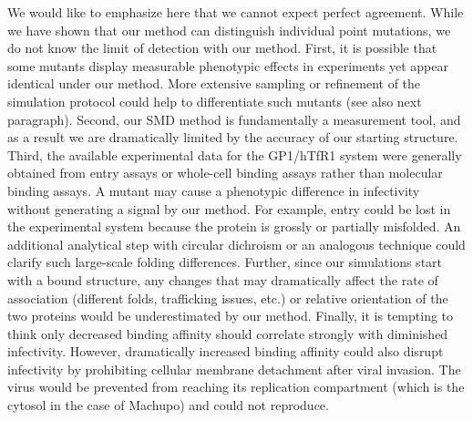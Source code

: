 \documentclass[12pt]{article}
\begin{document}

We would like to emphasize here that we cannot expect perfect agreement. While we have shown that our method can distinguish individual point mutations, we do not know the limit of detection with our method. First, it is possible that some mutants display measurable phenotypic effects in experiments yet appear identical under our method. More extensive sampling or refinement of the simulation protocol could help to differentiate such mutants (see also next paragraph). Second, our SMD method is fundamentally a measurement tool, and as a result we are dramatically limited by the accuracy of our starting structure. Third, the available experimental data for the GP1/hTfR1 system were generally obtained from entry assays or whole-cell binding assays rather than molecular binding assays. A mutant may cause a phenotypic difference in infectivity without generating a signal by our method. For example, entry could be lost in the experimental system because the protein is grossly or partially misfolded. An additional analytical step with circular dichroism or an analogous technique could clarify such large-scale folding differences. Further, since our simulations start with a bound structure, any changes that may dramatically affect the rate of association (different folds, trafficking issues, etc.) or relative orientation of the two proteins would be underestimated by our method. Finally, it is tempting to think only decreased binding affinity should correlate strongly with diminished infectivity. However, dramatically increased binding affinity could also disrupt infectivity by prohibiting cellular membrane detachment after viral invasion. The virus would be prevented from reaching its replication compartment (which is the cytosol in the case of Machupo) and could not reproduce.
\end{document}
